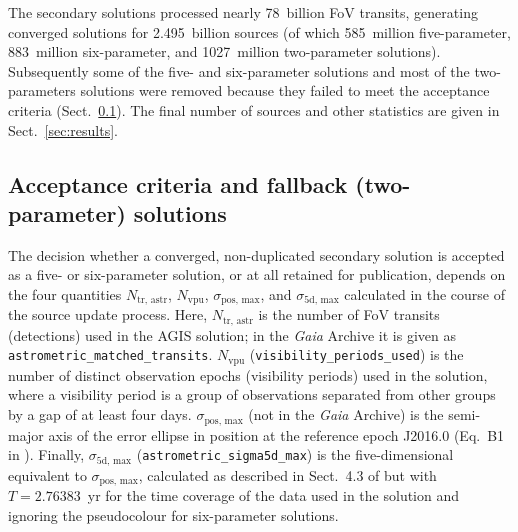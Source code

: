 \documentclass[longauth]{aa} %
\newcommand{\gacs}[1]{{\footnotesize\texttt{#1}}}
\begin{document}
The secondary solutions processed nearly 78~billion FoV transits, generating converged
solutions for 2.495~billion sources (of which 585~million five-parameter, 883~million six-parameter, 
and 1027~million two-parameter solutions). Subsequently some of the five- and six-parameter solutions 
and most of the two-parameters solutions were removed because they failed to meet the acceptance 
criteria (Sect.~\ref{sec:accept}). The final number of sources and other statistics are given in 
Sect.~\ref{sec:results}.

  
\subsection{Acceptance criteria and fallback (two-parameter) solutions}
\label{sec:accept}  

The decision whether a converged, non-duplicated secondary solution is accepted as a 
five- or six-parameter solution, or at all retained for publication, depends on the four
quantities $N_\text{tr, astr}$, $N_\text{vpu}$, $\sigma_\text{pos, max}$, and $\sigma_\text{5d, max}$
calculated in the course of the source update process. Here,
$N_\text{tr, astr}$ is the number of FoV transits (detections) used in the AGIS solution; in
the \textit{Gaia} Archive it is given as \gacs{astrometric\_matched\_transits}.
$N_\text{vpu}$ (\gacs{visibility\_periods\_used}) is the number of distinct observation epochs 
(visibility periods) used in the solution, where a visibility period is a group of observations 
separated from other groups by a gap of at least four days.
$\sigma_\text{pos, max}$ (not in the \textit{Gaia} Archive) is the semi-major axis of the 
error ellipse in position at the reference epoch J2016.0 (Eq.~B1 in ).
Finally, $\sigma_\text{5d, max}$ (\gacs{astrometric\_sigma5d\_max}) is the five-dimensional 
equivalent to $\sigma_\text{pos, max}$, calculated as described in Sect.~4.3 of 
 but with $T=2.76383$~yr for the time coverage of the data 
used in the solution and ignoring the pseudocolour for six-parameter solutions.
\end{document}
